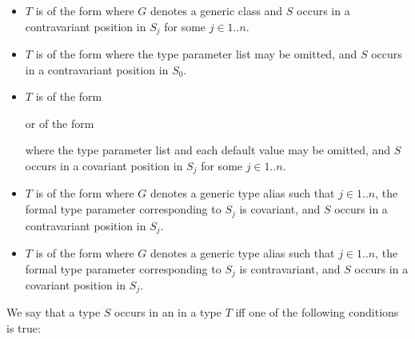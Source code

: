 \documentclass[makeidx]{article}
\begin{document}
\begin{itemize}
\item $T$ is of the form 
  where $G$ denotes a generic class
  and $S$ occurs in a contravariant position in $S_j$
  for some $j \in 1 .. n$.

\item $T$ is of the form
  where the type parameter list may be omitted,
  and $S$ occurs in a contravariant position in $S_0$.

\item $T$ is of the form



  \noindent
  or of the form



  \noindent
  where the type parameter list and each default value may be omitted,
  and $S$ occurs in a covariant position in $S_j$
  for some $j \in 1 .. n$.

\item $T$ is of the form 
  where $G$ denotes a generic type alias such that
  $j \in 1 .. n$,
  the formal type parameter corresponding to $S_j$ is covariant,
  and $S$ occurs in a contravariant position in $S_j$.

\item $T$ is of the form 
  where $G$ denotes a generic type alias such that
  $j \in 1 .. n$,
  the formal type parameter corresponding to $S_j$ is contravariant,
  and $S$ occurs in a covariant position in $S_j$.
\end{itemize}

\LMHash{}%
We say that a type $S$ occurs in an  in a type $T$
if{}f one of the following conditions is true:
\end{document}
